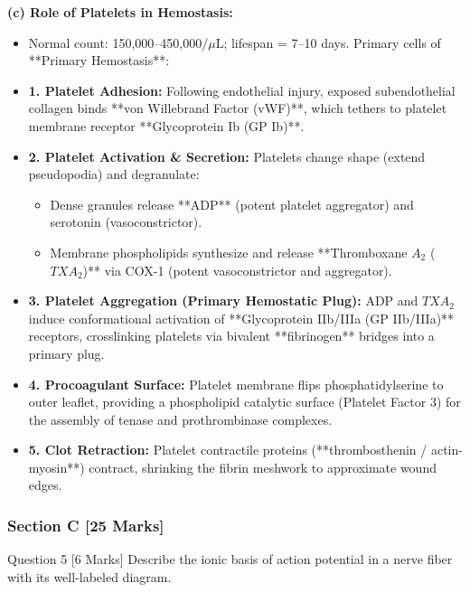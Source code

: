 \documentclass[11pt,a4paper]{article}
\begin{document}
\begin{ansbox}
\textbf{(c) Role of Platelets in Hemostasis:}
\begin{itemize}[leftmargin=*]
    \item Normal count: 150,000--450,000/$\mu$L; lifespan = 7--10 days. Primary cells of **Primary Hemostasis**:
    \item \textbf{1. Platelet Adhesion:} Following endothelial injury, exposed subendothelial collagen binds **von Willebrand Factor (vWF)**, which tethers to platelet membrane receptor **Glycoprotein Ib (GP Ib)**.
    \item \textbf{2. Platelet Activation \& Secretion:} Platelets change shape (extend pseudopodia) and degranulate:
    \begin{itemize}
        \item Dense granules release **ADP** (potent platelet aggregator) and serotonin (vasoconstrictor).
        \item Membrane phospholipids synthesize and release **Thromboxane $A_2$ ($TXA_2$)** via COX-1 (potent vasoconstrictor and aggregator).
    \end{itemize}
    \item \textbf{3. Platelet Aggregation (Primary Hemostatic Plug):} ADP and $TXA_2$ induce conformational activation of **Glycoprotein IIb/IIIa (GP IIb/IIIa)** receptors, crosslinking platelets via bivalent **fibrinogen** bridges into a primary plug.
    \item \textbf{4. Procoagulant Surface:} Platelet membrane flips phosphatidylserine to outer leaflet, providing a phospholipid catalytic surface (Platelet Factor 3) for the assembly of tenase and prothrombinase complexes.
    \item \textbf{5. Clot Retraction:} Platelet contractile proteins (**thrombosthenin / actin-myosin**) contract, shrinking the fibrin meshwork to approximate wound edges.
\end{itemize}
\end{ansbox}

\subsubsection{Section C [25 Marks]}

\begin{qbox}{Question 5 [6 Marks]}
Describe the ionic basis of action potential in a nerve fiber with its well-labeled diagram.
\end{qbox}
\end{document}

